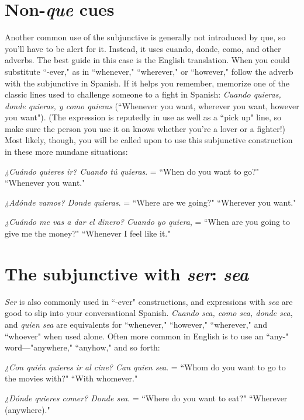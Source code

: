 \section{Non-\emph{que} cues}

Another common use of the subjunctive is generally not introduced by que, so you'll have to be alert for it. Instead, it uses cuando,
donde, como, and other adverbs. The best guide in this case is the English translation. When you could substitute ``-ever," as in ``whenever," ``wherever," or ``however," follow the adverb with the subjunctive
in Spanish. If it helps you remember, memorize one of the classic
lines used to challenge someone to a fight in Spanish: \emph{Cuando quieras,
donde quieras, y como quieras} (``Whenever you want, wherever you
want, however you want"). (The expression is reputedly in use as well
as a ``pick up" line, so make sure the person you use it on knows
whether you're a lover or a fighter!) Most likely, though, you will be
called upon to use this subjunctive construction in these more mundane situations:

\bsk

\indu \emph{¿Cuándo quieres ir? Cuando tú quieras}. = ``When do you
want to go?" ``Whenever you want."

\indu \emph{¿Adónde vamos? Donde quieras}. = ``Where are we going?"
``Wherever you want."

\indu \emph{¿Cuándo me vas a dar el dinero? Cuando yo quiera}, = ``When
are you going to give me the money?" ``Whenever I
feel like it."

\section{The subjunctive with \emph{ser}: \emph{sea}}

\emph{Ser} is also commonly used in ``-ever" constructions, and expressions with \emph{sea} are good to slip into your conversational Spanish.
\emph{Cuando sea, como sea, donde sea}, and \emph{quien sea} are equivalents for
``whenever," ``however," ``wherever," and ``whoever" when used alone.
Often more common in English is to use an ``any-" word---"anywhere," ``anyhow," and so forth:

\bsk

\indu \emph{¿Con quién quieres ir al cine? Can quien sea}. = ``Whom
do you want to go to the movies with?" ``With
whomever."

\indu \emph{¿Dónde quieres comer? Donde sea}. = ``Where do you want to
eat?" ``Wherever (anywhere)."

